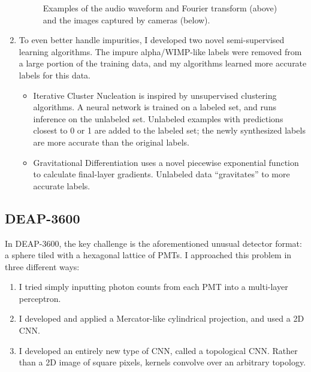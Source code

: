 \documentclass[12pt]{article}
\begin{document}
\begin{enumerate}
\begin{figure}[ht]
        \caption{Examples of the audio waveform and Fourier transform (above) and the images captured by cameras (below).}
    \end{figure}
    \item To even better handle impurities, I developed two novel semi-supervised learning algorithms. The impure alpha/WIMP-like labels were removed from a large portion of the training data, and my algorithms learned more accurate labels for this data.
    \begin{itemize}
        \item Iterative Cluster Nucleation is inspired by unsupervised clustering algorithms. A neural network is trained on a labeled set, and runs inference on the unlabeled set. Unlabeled examples with predictions closest to 0 or 1 are added to the labeled set; the newly synthesized labels are more accurate than the original labels.
        \item Gravitational Differentiation uses a novel piecewise exponential function to calculate final-layer gradients. Unlabeled data ``gravitates'' to more accurate labels.
    \end{itemize}
\end{enumerate}

\subsection{DEAP-3600}

In DEAP-3600, the key challenge is the aforementioned unusual detector format: a sphere tiled with a hexagonal lattice of PMTs. I approached this problem in three different ways:

\begin{enumerate}
    \item I tried simply inputting photon counts from each PMT into a multi-layer perceptron.
    \item I developed and applied a Mercator-like cylindrical projection, and used a 2D CNN.
    \item I developed an entirely new type of CNN, called a topological CNN. Rather than a 2D image of square pixels, kernels convolve over an arbitrary topology.
\end{enumerate}
\end{document}
